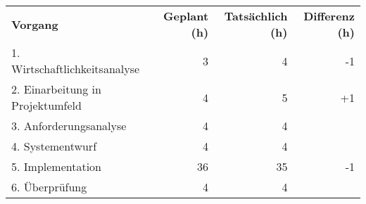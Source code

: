 \begin{tabularx}{\textwidth}{Xrrr}
    \rowcolor{KVGruen}\textbf{Vorgang} & \textbf{Geplant (h)} & \textbf{Tatsächlich (h)} & \textbf{Differenz (h)} \\
    1. Wirtschaftlichkeitsanalyse & 3 & 4 & -1 \\
    \rowcolor{KVGrau}2. Einarbeitung in Projektumfeld & 4   & 5   & +1 \\
    3. Anforderungsanalyse & 4 & 4 & \\
    \rowcolor{KVGrau}4. Systementwurf & 4   & 4   &  \\
    5. Implementation & 36 & 35 & -1 \\
    \rowcolor{KVGrau}6. Überprüfung & 4   & 4  &  \\
\end{tabularx}
    
